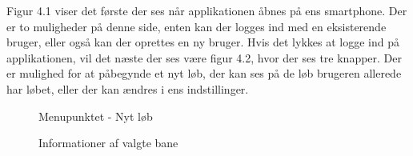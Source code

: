 Figur 4.1 viser det første der ses når applikationen åbnes på ens smartphone. Der er to muligheder på denne side, enten kan der logges ind med en eksisterende bruger, eller også kan der oprettes en ny bruger. 
Hvis det lykkes at logge ind på applikationen, vil det næste der ses være figur 4.2, hvor der ses tre knapper. Der er mulighed for at påbegynde et nyt løb, der kan ses på de løb brugeren allerede har løbet, eller der kan ændres i ens indstillinger.

\begin{figure}
	\centering
	\begin{minipage}{.5\textwidth}
		\centering
		\caption{Menupunktet - Nyt løb}
		\label{fig:test1}
	\end{minipage}%
	\begin{minipage}{.5\textwidth}
		\centering
		\caption{Informationer af valgte bane}
		\label{fig:test2}
	\end{minipage}
\end{figure}
